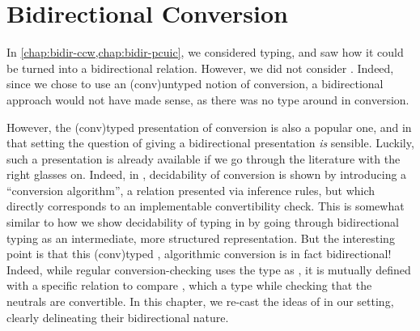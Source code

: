 \chapter{Bidirectional Conversion}
\label{chap:bidir-conv}

In \cref{chap:bidir-ccw,chap:bidir-pcuic}, we considered typing, and saw how it could be
turned into a bidirectional relation. However, we did not consider .
Indeed, since we chose to use an \kl(conv){untyped} notion of conversion, a bidirectional
approach would not have made sense, as there was no type around in conversion.

However, the \kl(conv){typed} presentation of conversion is also a popular one, and in that
setting the question of giving a bidirectional presentation \emph{is} sensible.
Luckily, such a presentation is already available if we go through the literature with the
right glasses on. Indeed, in ,
decidability of conversion is shown by introducing a “conversion algorithm”,
a relation presented via inference rules, but which directly corresponds to
an implementable convertibility check.
This is somewhat similar to how we show decidability of typing
in  by going through bidirectional typing as an intermediate,
more structured representation.
But the interesting point is that this \kl(conv){typed}%
,
algorithmic conversion is in fact bidirectional!
Indeed, while regular conversion-checking uses the type as
, it is mutually defined with a specific relation to compare ,
which  a type while checking that the neutrals are convertible.
In this chapter, we re-cast the ideas of \textcite{Abel2017} in our setting,
clearly delineating their bidirectional nature.

